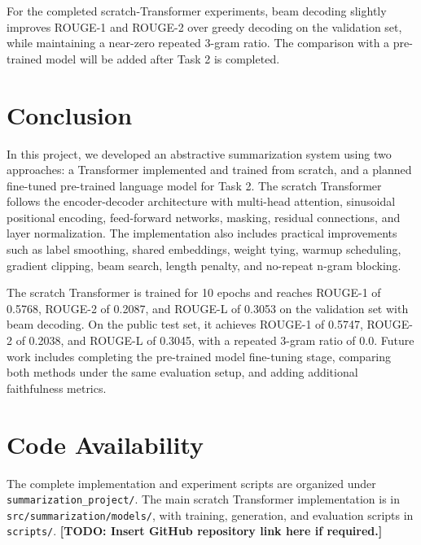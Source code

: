 \documentclass[conference]{IEEEtran}
\begin{document}
For the completed scratch-Transformer experiments, beam decoding slightly improves ROUGE-1 and ROUGE-2 over greedy decoding on the validation set, while maintaining a near-zero repeated 3-gram ratio. The comparison with a pre-trained model will be added after Task 2 is completed.

\section{Conclusion}
In this project, we developed an abstractive summarization system using two approaches: a Transformer implemented and trained from scratch, and a planned fine-tuned pre-trained language model for Task 2. The scratch Transformer follows the encoder-decoder architecture with multi-head attention, sinusoidal positional encoding, feed-forward networks, masking, residual connections, and layer normalization. The implementation also includes practical improvements such as label smoothing, shared embeddings, weight tying, warmup scheduling, gradient clipping, beam search, length penalty, and no-repeat n-gram blocking.

The scratch Transformer is trained for 10 epochs and reaches ROUGE-1 of 0.5768, ROUGE-2 of 0.2087, and ROUGE-L of 0.3053 on the validation set with beam decoding. On the public test set, it achieves ROUGE-1 of 0.5747, ROUGE-2 of 0.2038, and ROUGE-L of 0.3045, with a repeated 3-gram ratio of 0.0. Future work includes completing the pre-trained model fine-tuning stage, comparing both methods under the same evaluation setup, and adding additional faithfulness metrics.

\section*{Code Availability}
The complete implementation and experiment scripts are organized under \texttt{summarization\_project/}. The main scratch Transformer implementation is in \texttt{src/summarization/models/}, with training, generation, and evaluation scripts in \texttt{scripts/}. \textbf{[TODO: Insert GitHub repository link here if required.]}
\end{document}

